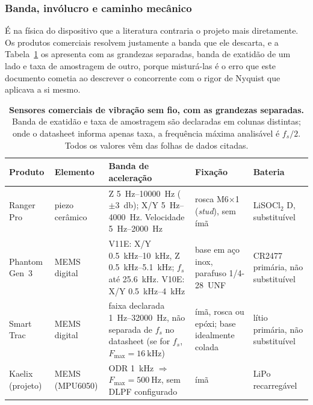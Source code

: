 \documentclass[11pt,a4paper]{article}
\begin{document}
\subsubsection{Banda, invólucro e caminho mecânico}

É na física do dispositivo que a literatura contraria o projeto mais diretamente. Os
produtos comerciais resolvem justamente a banda que ele descarta, e a
Tabela~\ref{tab:comerciais} os apresenta com as grandezas separadas, banda de exatidão de
um lado e taxa de amostragem de outro, porque misturá-las é o erro que este documento
cometia ao descrever o concorrente com o rigor de Nyquist que aplicava a si mesmo.

\begin{table}[!htb]
\centering
\caption{\textbf{Sensores comerciais de vibração sem fio, com as grandezas separadas.}
Banda de exatidão e taxa de amostragem são declaradas em colunas distintas; onde o
datasheet informa apenas taxa, a frequência máxima analisável é $f_s/2$. Todos os valores
vêm das folhas de dados citadas.}
\label{tab:comerciais}
\footnotesize
\setlength{\tabcolsep}{4pt}
\begin{tabular}{@{}p{2.2cm}p{1.7cm}p{4.9cm}p{2.6cm}p{2.4cm}@{}}
\toprule
\textbf{Produto} & \textbf{Elemento} & \textbf{Banda de aceleração} & \textbf{Fixação} & \textbf{Bateria} \\
\midrule
Ranger Pro \cite{bentlynevada2025}
  & piezo cerâmico
  & Z \SIrange{5}{10000}{\hertz} ($\pm$\SI{3}{\decibel}); X/Y \SIrange{5}{4000}{\hertz}. Velocidade \SIrange{5}{2000}{\hertz}
  & rosca M6$\times$1 (\emph{stud}), sem ímã
  & LiSOCl$_2$ D, substituível \\[3pt]
Phantom Gen~3 \cite{erbessd2025}
  & MEMS digital
  & V11E: X/Y \SIrange{0,5}{10}{\kilo\hertz}, Z \SIrange{0,5}{5,1}{\kilo\hertz}; $f_s$ até \SI{25,6}{\kilo\hertz}. V10E: X/Y \SIrange{0,5}{4}{\kilo\hertz}
  & base em aço inox, parafuso 1/4-28~UNF
  & CR2477 primária, não substituível \\[3pt]
Smart Trac \cite{tractian2022}
  & MEMS digital
  & faixa declarada \SIrange{1}{32000}{\hertz}, não separada de $f_s$ no datasheet (se for $f_s$, $F_{\max}=\SI{16}{\kilo\hertz}$)
  & ímã, rosca ou epóxi; base idealmente colada
  & lítio primária, não substituível \\[3pt]
Kaelix (projeto)
  & MEMS (MPU6050)
  & ODR \SI{1}{\kilo\hertz} $\Rightarrow$ $F_{\max}=\SI{500}{\hertz}$, sem DLPF configurado
  & ímã
  & LiPo recarregável \\
\bottomrule
\end{tabular}
\end{table}
\end{document}
